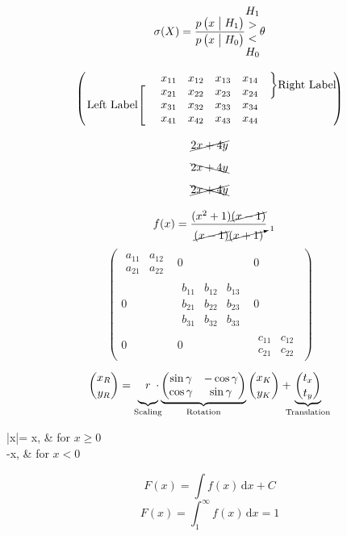 \documentclass{article}
\begin{document}
	\pagebreak
	
	\[	
		\setstackgap{L}{\baselineskip}
		\sigma(X) = \frac{p \left(x \bigm| H_1 \right)}							{p \left(x \bigm| H_0 \right)}
		\Vectorstack{H_1 > < H_0}
		\theta	
	\]
	
	\[
		\begin{pmatrix}
			& x_{11} & x_{12} & x_{13} & x_{14} &
				\rdelim\}{2}{2cm}[Right Label] \\
			\ldelim[{3}{2cm}[Left Label] 
				& x_{21} & x_{22} & x_{23} & x_{24} \\
			& x_{31} & x_{32} & x_{33} & x_{34} \\
			& x_{41} & x_{42} & x_{43} & x_{44} 
		\end{pmatrix}			
	\]
	
	\[\cancel{2x + 4y}\]
	\[\bcancel{2x + 4y}\]	
	\[\xcancel{2x + 4y}\]
	
	\[
		f(x) = \frac{(x^2+1)\cancel{(x-1)}}
					{\cancel{(x-1)}\cancelto{1}{(x+1)}}	
	\]	
	\bigskip
	\[
		\left(
		\begin{array}{ccc}
		 
		\begin{array}{cc}
		a_{11} & a_{12} \\ a_{21} & a_{22}  
		\end{array} & 0 & 0 \\
		
		0 & \begin{array}{ccc}
		b_{11} & b_{12} & b_{13}\\ b_{21} & b_{22} & 					b_{23}\\ b_{31} & b_{32} & b_{33}
		\end{array} & 0 \\
		
		0 & 0 & \begin{array}{cc}
		c_{11} & c_{12} \\
		c_{21} & c_{22}  
		\end{array} 
		
		\end{array}
		\right)
	\]
	
	\bigskip
	
	\begin{equation*}
		\binom{x_R}{y_R} = \underbrace{r							\vphantom{\binom{A}{B}}}_{\text{Scaling}}
		\hspace{-7pt} \cdot
		\underbrace{
		\begin{pmatrix}
		\sin{\gamma} & -\cos{\gamma} \\ 
		\cos{\gamma} & \sin{\gamma}
		\end{pmatrix}
		}_{\text{Rotation}}\binom{x_K}{y_K} 
		+ \hspace{-7pt} \underbrace{\binom{t_x}{t_y}}				_{\text{Translation}}
	\end{equation*}
	
	\begin{subnumcases}{|x|=}
		x,  & for $x \geq 0$ \\
		-x, & for $x < 0$ 
	\end{subnumcases}
	
	\begin{equation}
		F(x) = \int f(x)\,\mathrm{d}x + C 
	\end{equation}
	\begin{equation}
		F(x) = \int_1^\infty f(x)\,\mathrm{d}x=1 
	\end{equation}
	
\end{document}
